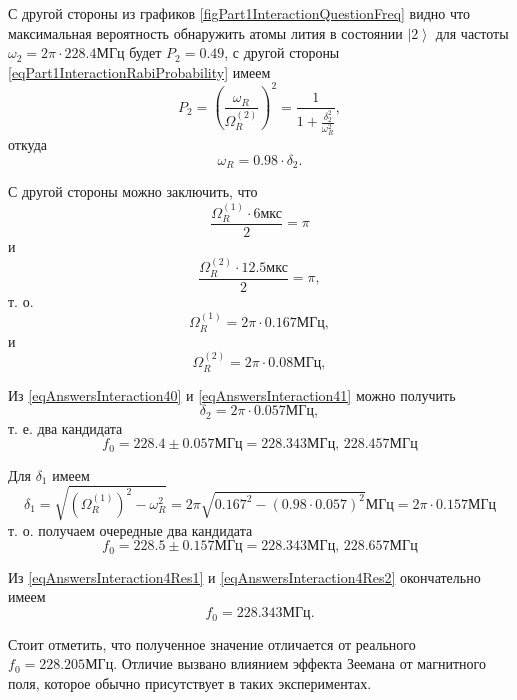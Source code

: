 С другой стороны из графиков
\autoref{figPart1InteractionQuestionFreq} видно что максимальная
вероятность обнаружить атомы лития в состоянии $\left|2\right>$ для
частоты $\omega_2 = 2 \pi \cdot 228.4 \mbox{МГц}$ будет $P_2 = 0.49$,
с другой стороны \eqref{eqPart1InteractionRabiProbability} имеем
\begin{equation}
  P_2 = \left(\frac{\omega_R}{\Omega_R^{(2)}}\right)^2 =
  \frac{1}{1 + \frac{\delta_2^2}{\omega_R^2}},
  \nonumber
\end{equation}
откуда
\begin{equation}
  \omega_R = 0.98 \cdot \delta_2 .
  \label{eqAnswersInteraction41}
\end{equation}

С другой стороны можно заключить, что
\[
\frac{\Omega_R^{(1)} \cdot 6 \mbox{мкс}}{2} = \pi
\]
и
\[
\frac{\Omega_R^{(2)} \cdot 12.5 \mbox{мкс}}{2} = \pi,
\]
т. о.
\[
\Omega_R^{(1)} = 2 \pi \cdot 0.167 \mbox{МГц},
\]
и
\[
\Omega_R^{(2)} = 2 \pi \cdot 0.08 \mbox{МГц},
\]

Из \eqref{eqAnswersInteraction40} и  \eqref{eqAnswersInteraction41}
можно получить
\[
\delta_2 = 2 \pi \cdot 0.057 \mbox{МГц},
\]
т. е. два кандидата
\begin{equation}
  f_0 = 228.4 \pm 0.057 \mbox{МГц} = 228.343 \mbox{МГц},\,
  228.457 \mbox{МГц} 
\label{eqAnswersInteraction4Res1}
\end{equation}

Для $\delta_1$ имеем
\[
\delta_1 = \sqrt{\left(\Omega_R^{(1)}\right)^2 - \omega_R^2} =
2 \pi \sqrt{0.167^2 - (0.98 \cdot 0.057)^2} \mbox{МГц} =
2 \pi \cdot 0.157 \mbox{МГц}
\]
т. о. получаем очередные два кандидата
\begin{equation}
  f_0 = 228.5 \pm 0.157 \mbox{МГц} = 228.343 \mbox{МГц},\,
  228.657 \mbox{МГц} 
\label{eqAnswersInteraction4Res2}
\end{equation}

Из \eqref{eqAnswersInteraction4Res1} и
\eqref{eqAnswersInteraction4Res2} окончательно имеем
\[
f_0 = 228.343 \mbox{МГц}.
\]

Стоит отметить, что полученное значение отличается от реального $f_0 =
228.205 \mbox{МГц}$. Отличие вызвано влиянием эффекта Зеемана от
магнитного поля, которое обычно присутствует в таких экспериментах.




